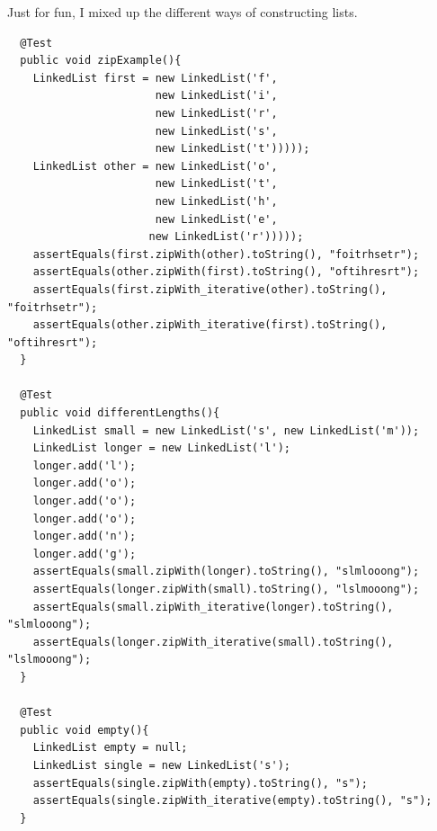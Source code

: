\documentclass[twoside=false,DIV=14]{scrartcl}
\begin{document}
  Just for fun, I mixed up the different ways of constructing lists.
  \begin{lstlisting}
  @Test
  public void zipExample(){
    LinkedList first = new LinkedList('f', 
                       new LinkedList('i', 
                       new LinkedList('r', 
                       new LinkedList('s', 
                       new LinkedList('t')))));
    LinkedList other = new LinkedList('o', 
                       new LinkedList('t', 
                       new LinkedList('h', 
                       new LinkedList('e', 
                      new LinkedList('r')))));
    assertEquals(first.zipWith(other).toString(), "foitrhsetr");
    assertEquals(other.zipWith(first).toString(), "oftihresrt");
    assertEquals(first.zipWith_iterative(other).toString(), "foitrhsetr");
    assertEquals(other.zipWith_iterative(first).toString(), "oftihresrt");
  }

  @Test
  public void differentLengths(){
    LinkedList small = new LinkedList('s', new LinkedList('m'));
    LinkedList longer = new LinkedList('l');
    longer.add('l');
    longer.add('o');
    longer.add('o');
    longer.add('o');
    longer.add('n');
    longer.add('g');
    assertEquals(small.zipWith(longer).toString(), "slmlooong");
    assertEquals(longer.zipWith(small).toString(), "lslmooong");
    assertEquals(small.zipWith_iterative(longer).toString(), "slmlooong");
    assertEquals(longer.zipWith_iterative(small).toString(), "lslmooong");
  }

  @Test
  public void empty(){
    LinkedList empty = null;
    LinkedList single = new LinkedList('s');
    assertEquals(single.zipWith(empty).toString(), "s");
    assertEquals(single.zipWith_iterative(empty).toString(), "s");
  }
  \end{lstlisting}
  
\end{document}
